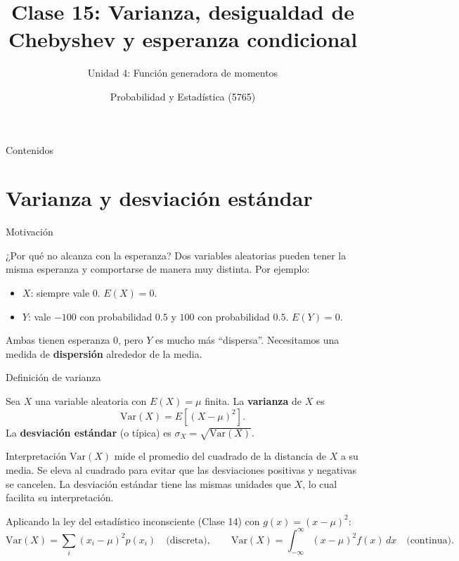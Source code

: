 \documentclass[aspectratio=169,11pt]{beamer}
\title[Prob. y Estadística]{Clase 15: Varianza, desigualdad de Chebyshev y esperanza condicional}
\subtitle{Unidad 4: Función generadora de momentos}
\institute[UNS]{Universidad Nacional del Sur \\ Departamento de Matemática}
\author{Probabilidad y Estadística (5765)}
\date{}
\begin{document}
\begin{frame}
\titlepage
\end{frame}

\begin{frame}{Contenidos}
\tableofcontents
\end{frame}

\section{Varianza y desviación estándar}

\begin{frame}{Motivación}
\begin{block}{¿Por qué no alcanza con la esperanza?}
Dos variables aleatorias pueden tener la misma esperanza y comportarse de manera muy distinta. Por ejemplo:
\begin{itemize}
\item $X$: siempre vale $0$. $E(X) = 0$.
\item $Y$: vale $-100$ con probabilidad $0.5$ y $100$ con probabilidad $0.5$. $E(Y) = 0$.
\end{itemize}
Ambas tienen esperanza $0$, pero $Y$ es mucho más ``dispersa''. Necesitamos una medida de \textbf{dispersión} alrededor de la media.
\end{block}
\end{frame}

\begin{frame}{Definición de varianza}
\begin{definition}[Varianza]
Sea $X$ una variable aleatoria con $E(X) = \mu$ finita. La \textbf{varianza} de $X$ es
\[
\text{Var}(X) = E\left[(X-\mu)^2\right].
\]
La \textbf{desviación estándar} (o típica) es $\sigma_X = \sqrt{\text{Var}(X)}$.
\end{definition}

\begin{block}{Interpretación}
$\text{Var}(X)$ mide el promedio del cuadrado de la distancia de $X$ a su media. Se eleva al cuadrado para evitar que las desviaciones positivas y negativas se cancelen. La desviación estándar tiene las mismas unidades que $X$, lo cual facilita su interpretación.
\end{block}

Aplicando la ley del estadístico inconsciente (Clase 14) con $g(x) = (x-\mu)^2$:
\[
\text{Var}(X) = \sum_i (x_i - \mu)^2 p(x_i) \quad \text{(discreta)}, \qquad \text{Var}(X) = \int_{-\infty}^\infty (x-\mu)^2 f(x)\, dx \quad \text{(continua)}.
\]
\end{frame}
\end{document}
